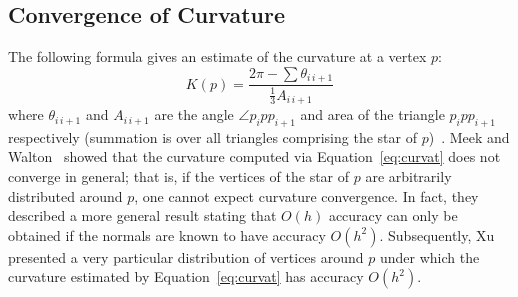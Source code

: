 


\subsection{Convergence of Curvature}
\label{chap1:sec:curvconvergence}
The following formula gives an estimate of the curvature at a
vertex $p$:
\begin{equation}
K(p) = \frac{2\pi-\sum \theta_{i\,i+1}}{\frac{1}{3}A_{i\,i+1}}
\label{eq:curvat}
\end{equation}
\noindent where $\theta_{i\,i+1}$ and $A_{i\,i+1}$ are the angle 
$\angle p_ipp_{i+1}$ and area of the
triangle $p_ipp_{i+1}$ respectively (summation is over all triangles comprising 
the star of $p$)~\cite{meek2000}. 
Meek and Walton~\cite{meek2000} showed that the curvature computed via 
Equation~\ref{eq:curvat}
does not converge in general; that is, if the vertices of the star of $p$ 
are arbitrarily distributed
around $p$, one cannot expect curvature convergence. In fact, they
described a more general result stating that $O(h)$ accuracy can only be
obtained if the normals are known to have accuracy $O(h^2)$. Subsequently,
Xu~\cite{xu2006} presented a very particular distribution of vertices around $p$
under which the curvature estimated by Equation~\ref{eq:curvat} has accuracy $O(h^2)$. 

